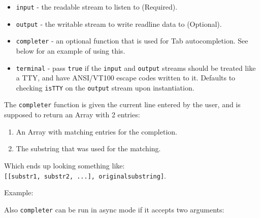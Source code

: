 \begin{itemize}
\item
  \texttt{input} - the readable stream to listen to (Required).
\item
  \texttt{output} - the writable stream to write readline data to
  (Optional).
\item
  \texttt{completer} - an optional function that is used for Tab
  autocompletion. See below for an example of using this.
\item
  \texttt{terminal} - pass \texttt{true} if the \texttt{input} and
  \texttt{output} streams should be treated like a TTY, and have
  ANSI/VT100 escape codes written to it. Defaults to checking
  \texttt{isTTY} on the \texttt{output} stream upon instantiation.
\end{itemize}

The \texttt{completer} function is given the current line entered by the
user, and is supposed to return an Array with 2 entries:

\begin{enumerate}
\def\labelenumi{\arabic{enumi}.}
\item
  An Array with matching entries for the completion.
\item
  The substring that was used for the matching.
\end{enumerate}

Which ends up looking something like:
\texttt{{[}{[}substr1,\ substr2,\ ...{]},\ originalsubstring{]}}.

Example:

\begin{Shaded}
\begin{Highlighting}[]
 
   \NormalTok{(}\NormalTok{)}
   \NormalTok{(}  \NormalTok{\})}
   \NormalTok{[} \NormalTok{? hits : completions, line]}
\NormalTok{\}}
\end{Highlighting}
\end{Shaded}

Also \texttt{completer} can be run in async mode if it accepts two
arguments:

